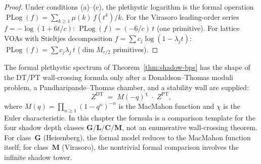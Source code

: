 \begin{proof}
Under conditions \textup{(a)}--\textup{(c)}, the plethystic logarithm
is the formal operation
$\operatorname{PLog}(f) = \sum_{k\ge1}\mu(k)\,f(t^k)/k$.
For the Virasoro leading-order series
$f = -\log(1{+}6t/c)$: $\operatorname{PLog}(f)=(-6/c)\,t$
(one primitive). For lattice VOAs with Stieltjes
decomposition $f = \sum c_j\log(1{-}\lambda_j t)$:
$\operatorname{PLog}(f) = \sum c_j\lambda_j\,t$
($\dim M_{r/2}$ primitives).
\end{proof}

\begin{remark}
\label{rem:dt-pt-wall-crossing}
The formal plethystic spectrum of Theorem~\ref{thm:shadow-bps} has the
shape of the DT/PT wall-crossing formula only after a Donaldson--Thomas
moduli problem, a Pandharipande--Thomas chamber, and a stability wall
are supplied:
\begin{equation}\label{eq:dt-pt-wall-crossing}
 Z^{\mathrm{DT}}
 \;=\;
 M(-q)^{\chi}\;\cdot\;Z^{\mathrm{PT}},
\end{equation}
where $M(q) = \prod_{n \ge 1}(1 - q^n)^{-n}$ is the
MacMahon function and $\chi$ is the Euler characteristic.
In this chapter the formula is a comparison template for the four
shadow depth classes $\mathbf{G}/\mathbf{L}/\mathbf{C}/\mathbf{M}$,
not an enumerative wall-crossing theorem. For
class~$\mathbf{G}$ (Heisenberg), the formal model reduces to the
MacMahon function itself; for class~$\mathbf{M}$
(Virasoro), the nontrivial formal comparison involves the
infinite shadow tower.


\end{remark}
